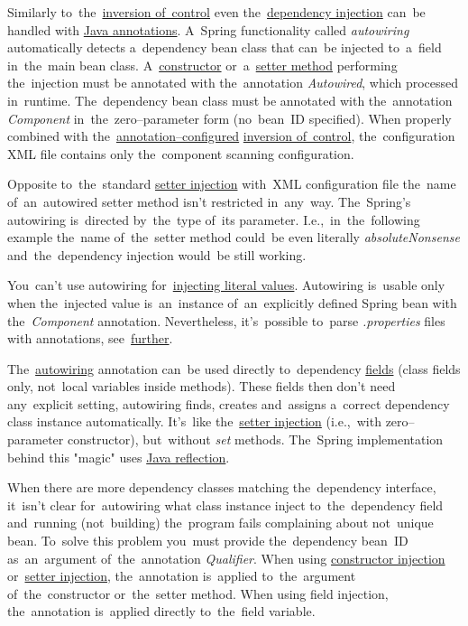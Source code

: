 \label{autowiring}
Similarly to~the~\hyperref[springinversionofcontrol]{inversion of~control} even the~\hyperref[springdependencyinjection]{dependency injection} can~be handled with \hyperref[javaannotation]{Java annotations}.
A~Spring functionality called \textit{autowiring} automatically detects a~dependency bean class that can~be injected to~a~field in~the~main bean class.
A~\hyperref[constructorinjection]{constructor} or~a~\hyperref[setterinjection]{setter method} performing the~injection must be annotated with the~annotation \textit{Autowired}, which processed in~runtime.
The~dependency bean class must be annotated with the~annotation \textit{Component} in~the~zero--parameter form (no~bean~ID specified).
When properly combined with the~\hyperref[iocannotations]{annotation--configured} \hyperref[springinversionofcontrol]{inversion of~control}, the~configuration XML file contains only the~component scanning configuration.

\note Opposite to~the~standard \hyperref[setterinjection]{setter injection} with~XML configuration file the~name of~an~autowired setter method isn't restricted in~any~way.
The~Spring's autowiring is~directed by~the~type of~its parameter.
I.e.,~in~the~following example the~name of~the~setter method could~be even literally \textit{absoluteNonsense} and~the~dependency injection would~be still working.

\warning You~can't use autowiring for~\hyperref[injectingliteralvalues]{injecting literal values}.
Autowiring is~usable only when the~injected value is~an~instance of~an~explicitly defined Spring bean with the~\textit{Component} annotation.
Nevertheless, it's~possible to~parse \textit{.properties} files with annotations, see~\hyperref[readingpropertiesannotations]{further}.

\label{fieldinjection}
The~\hyperref[autowiring]{autowiring} annotation can~be used directly to~dependency \hyperref[variablefieldproperty]{fields} (class fields only, not~local variables inside methods).
These fields then don't need any~explicit setting, autowiring finds, creates and~assigns a~correct dependency class instance automatically.
It's~like the~\hyperref[setterinjection]{setter injection} (i.e.,~with zero--parameter constructor), but~without \textit{set} methods.
The~Spring implementation behind this "magic" uses \hyperref[reflection]{Java reflection}.

When there are more dependency classes matching the~dependency interface, it~isn't clear for~autowiring what class instance inject to~the~dependency field and~running (not~building) the~program fails complaining about not~unique bean.
To~solve this problem you~must provide the~dependency bean~ID as~an~argument of~the~annotation \textit{Qualifier}.
When using \hyperref[constructorinjectionautowire]{constructor injection} or~\hyperref[setterinjectionautowire]{setter injection}, the~annotation is~applied to~the~argument of~the~constructor or~the~setter method.
When using field injection, the~annotation is~applied directly to~the~field variable.
\newpage

